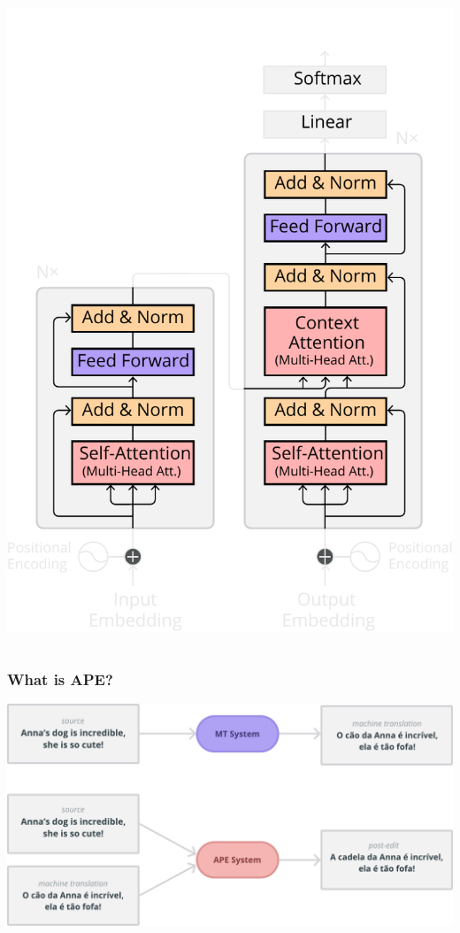 \documentclass[xetex,aspectratio=169,xcolor,professionalfonts,hyperref]{beamer}
\begin{document}
\begin{frame}
\begin{columns}
        \begin{column}{0.4\columnwidth}
            \vspace{-1.5cm}
            \begin{center}
                \includegraphics[width=0.8\columnwidth]{figures/transformer_mybg}
            \end{center}
        \end{column}
    \end{columns}

\end{frame}

\begin{frame}
    \frametitle{What is APE?}
    \centering
    \includegraphics[width=0.8\columnwidth]{figures/ape.pdf}
\end{frame}
\end{document}
